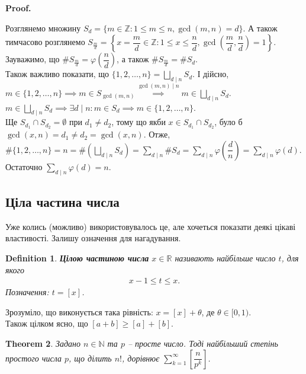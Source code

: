 \documentclass[a4paper, 10pt]{article}
\makeatletter
\theoremstyle{theoremdd}
\newtheorem{theorem}{Theorem}[subsection]
\theoremstyle{theoremdd}
\newtheorem{definition}[theorem]{Definition}
\theoremstyle{theoremdd}
\theoremstyle{theoremdd}
\theoremstyle{theoremdd}
\theoremstyle{theoremdd}
\theoremstyle{theoremdd}
\theoremstyle{theoremdd}
\renewenvironment{proof}[1][Proof.\\]{\par
\pushQED{\hfill \qed}%
\normalfont \topsep6\p@\@plus6\p@\relax
\trivlist
\item\relax
{\bfseries
#1\@addpunct{.}}\hspace\labelsep\ignorespaces
}{%
\popQED\endtrivlist\@endpefalse
}
\makeatother
\begin{document}
\begin{proof}
Розглянемо множину $S_d = \{m \in \mathbb{Z}: 1 \leq m \leq n, \gcd(m,n) = d\}$. А також тимчасово розглянемо $S_{\frac{m}{d}} = \left\{ x = \dfrac{m}{d} \in \mathbb{Z}: 1 \leq x \leq \dfrac{n}{d}, \gcd\left(\dfrac{m}{d},\dfrac{n}{d}\right) = 1\right\}$.\\
Зауважимо, що $\# S_{\frac{m}{d}} = \varphi\left( \dfrac{n}{d} \right)$, а також $\# S_{\frac{m}{d}} = \#S_d$.\\
Також важливо показати, що $\{1,2,\dots,n\} = \displaystyle\bigsqcup_{d \mid n} S_d$. І дійсно,\\
$\displaystyle m \in \{1,2,\dots,n\} \implies m \in S_{\gcd(m,n)} \overset{\gcd(m,n) \mid n}{\implies} m \in \bigsqcup_{d \mid n} S_d$.\\
$m \in \displaystyle\bigsqcup_{d \mid n} S_d \implies \exists d \mid n: m \in S_d \implies m \in \{1,2,\dots,n\}$.\\
Ще $S_{d_1} \cap S_{d_2} = \emptyset$ при $d_1 \neq d_2$, тому що якби $x \in S_{d_1} \cap S_{d_2}$, було б $\gcd(x,n)=d_1 \neq d_2 = \gcd(x,n)$. Отже, \\
$\displaystyle \# \{1,2,\dots,n\} = n = \#\left( \bigsqcup_{d \mid n} S_d \right) = \sum_{d \mid n} \# S_d = \sum_{d \mid n} \varphi\left( \dfrac{d}{n} \right) = \sum_{d \mid n} \varphi(d)$.\\
Остаточно $\displaystyle\sum_{d \mid n} \varphi(d) = n$.
\end{proof}

\subsection{Ціла частина числа}
Уже колись (можливо) використовувалось це, але хочеться показати деякі цікаві властивості. Залишу означення для нагадування.

\begin{definition}
\textbf{Цілою частиною числа} $x \in \mathbb{R}$ називають найбільше число $t$, для якого
\begin{align*}
x-1 \leq t \leq x.
\end{align*}
Позначення: $t = [x]$.
\end{definition}

Зрозуміло, що виконується така рівність: $x = [x] + \theta$, де $\theta \in [0,1)$.\\
Також цілком ясно, що $[a+b] \geq [a] + [b]$.

\begin{theorem}
Задано $n \in \mathbb{N}$ та $p$ -- просте число. Тоді найбільший степінь простого числа $p$, що ділить $n!$, дорівнює $\displaystyle\sum_{k=1}^\infty \left[ \dfrac{n}{p^k} \right]$.
\end{theorem}
\end{document}
